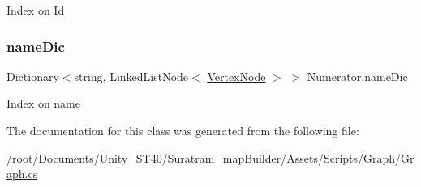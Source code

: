 Index on Id

\mbox{\label{classNumerator_a84d702ba15a33e939ce9b2869becc19e}} 
\subsubsection{\texorpdfstring{name\+Dic}{nameDic}}
{\footnotesize\ttfamily Dictionary$<$string, Linked\+List\+Node$<$ \hyperlink{classVertexNode}{Vertex\+Node} $>$ $>$ Numerator.\+name\+Dic}



Index on name



The documentation for this class was generated from the following file\+:\begin{DoxyCompactItemize}
\item 
/root/\+Documents/\+Unity\+\_\+\+S\+T40/\+Suratram\+\_\+map\+Builder/\+Assets/\+Scripts/\+Graph/\hyperlink{Graph_8cs}{Graph.\+cs}\end{DoxyCompactItemize}
